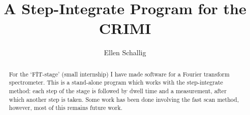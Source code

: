\documentclass[12pt,a4paper]{article}
\title{A Step-Integrate Program for the CRIMI}
\author{Ellen Schallig}
\begin{document}
 
\maketitle

 \begin{abstract}
 For the `FIT-stage' (small internship) I have made software for a Fourier transform spectrometer. This is a stand-alone program which works with the step-integrate method: each step of the stage is followed by dwell time and a measurement, after which another step is taken. Some work has been done involving the fast scan method, however, most of this remains future work.
 \end{abstract}





%

\printbibliography
\end{document}
